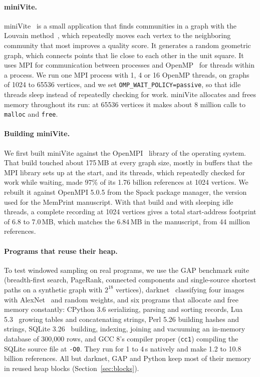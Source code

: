 \documentclass[11pt]{article}
\newcommand{\memprint}{MemPrint}
\newcommand{\secref}[1]{Section~\ref{#1}}
\begin{document}
\paragraph{miniVite.}
miniVite~\cite{minivite} is a small application that finds communities in a graph with the Louvain method~\cite{blondel2008louvain}, which repeatedly moves each vertex to the neighboring community that most improves a quality score. It generates a random geometric graph, which connects points that lie close to each other in the unit square. It uses MPI for communication between processes and OpenMP~\cite{openmp51} for threads within a process. We run one MPI process with 1, 4 or 16 OpenMP threads, on graphs of 1024 to 65536 vertices, and we set \texttt{OMP\_WAIT\_POLICY=passive}, so that idle threads sleep instead of repeatedly checking for work. miniVite allocates and frees memory throughout its run: at 65536 vertices it makes about 8 million calls to \texttt{malloc} and \texttt{free}.

\paragraph{Building miniVite.}
We first built miniVite against the OpenMPI~\cite{gabriel2004openmpi} library of the operating system. That build touched about 175\,MB at every graph size, mostly in buffers that the MPI library sets up at the start, and its threads, which repeatedly checked for work while waiting, made 97\% of its 1.76 billion references at 1024 vertices. We rebuilt it against OpenMPI 5.0.5 from the Spack package manager, the version used for the \memprint{} manuscript. With that build and with sleeping idle threads, a complete recording at 1024 vertices gives a total start-address footprint of 6.8 to 7.0\,MB, which matches the 6.84\,MB in the manuscript, from 44 million references.

\paragraph{Programs that reuse their heap.}
To test windowed sampling on real programs, we use the GAP benchmark suite~\cite{beamer2015gap} (breadth-first search, PageRank, connected components and single-source shortest paths on a synthetic graph with $2^{18}$ vertices), darknet~\cite{darknet13} classifying four images with AlexNet~\cite{krizhevsky2012alexnet} and random weights, and six programs that allocate and free memory constantly: CPython 3.6 serializing, parsing and sorting records, Lua 5.3~\cite{ierusalimschy1996lua} growing tables and concatenating strings, Perl 5.26 building hashes and strings, SQLite 3.26~\cite{sqlite} building, indexing, joining and vacuuming an in-memory database of 300{,}000 rows, and GCC 8's compiler proper (\texttt{cc1}) compiling the SQLite source file at \texttt{-O0}. They run for 1 to 4\,s natively and make 1.2 to 10.8 billion references. All but darknet, GAP and Python keep most of their memory in reused heap blocks (\secref{sec:blocks}).
\end{document}
